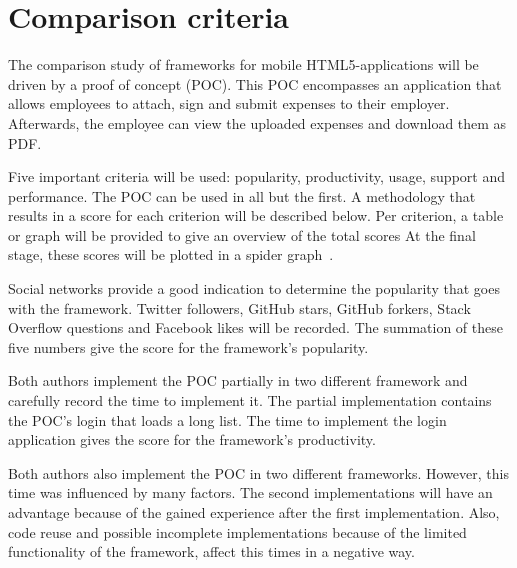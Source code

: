\documentclass[a4paper]{artikel3}
\newcommand{\setspace}[0]{\vspace{2mm}}
\renewcommand{\paragraph}[1]{\setspace \noindent {\bf #1}  }
\begin{document}

\section{Comparison criteria} %
\label{sec:comparisoncriteria}

The comparison study of frameworks for mobile HTML5-applications will be driven by a proof of concept (POC).  
This POC encompasses an application that allows employees to attach, sign and submit expenses to their employer.
Afterwards, the employee can view the uploaded expenses and download them as PDF.

Five important criteria will be used:  popularity,  productivity,  usage,  support and performance. 
The POC can be used in all but the first.   
A methodology that results in a score for each criterion will be described below.  
Per criterion,  a table or graph will be provided to give an overview of the total scores
At the final stage,  these scores will be plotted in a spider graph~\cite{Few2005}.   

\paragraph{Popularity}
Social networks provide a good indication to determine the popularity that goes with the framework.  
Twitter followers,  GitHub stars,  GitHub forkers,  Stack Overflow questions and Facebook likes will be recorded.
The summation of these five numbers give the score for the framework's popularity.  


\paragraph{Productivity}
Both authors implement the POC partially in two different framework and carefully record the time to implement it. 
The partial implementation contains the POC's login that loads a long list.
The time to implement the login application gives the score for the framework's productivity. 

Both authors also implement the POC in two different frameworks.
However,  this time was influenced by many factors.
The second implementations will have an advantage because of the gained experience after the first implementation.
Also,  code reuse and possible incomplete implementations because of the limited functionality of the framework, affect this times in a negative way.
\end{document}
